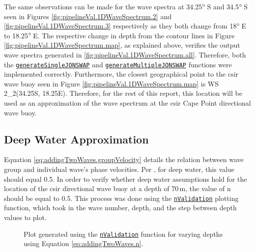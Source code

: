 The same observations can be made for the wave spectra at 34.25$\degree$\,S and 34.5$\degree$\,S seen in Figures \ref{fig:pipelineVal.1DWaveSpectrum.2} and \ref{fig:pipelineVal.1DWaveSpectrum.3} respectively as they both change from 18$\degree$\,E to 18.25$\degree$\,E. The respective change in depth from the contour lines in Figure \ref{fig:pipelineVal.1DWaveSpectrum.map}, as explained above, verifies the output wave spectra generated in \ref{fig:pipelineVal.1DWaveSpectrum.all}. Therefore, both the \href{https://github.com/JNSRYA006/sar-parameter-extraction-pipeline/blob/main/functions/waveSpectra/generateSingleJONSWAP.m}{\lstinline{generateSingleJONSWAP}} and \href{https://github.com/JNSRYA006/sar-parameter-extraction-pipeline/blob/main/functions/waveSpectra/generateMultipleJONSWAP.m}{\lstinline{generateMultipleJONSWAP}} functions were implemented correctly. Furthermore, the closest geographical point to the \acs{csir} wave buoy seen in Figure \ref{fig:pipelineVal.1DWaveSpectrum.map} is WS 2\_2(34.25S, 18.25E). Therefore, for the rest of this report, this location will be used as an approximation of the wave spectrum at the \acs{csir} Cape Point directional wave buoy.

\subsection{Deep Water Approximation} \label{subsec:pipelineVal.waveSpectra.deepWater}

Equation \ref{eq:addingTwoWaves.groupVelocity} details the relation between wave group and individual wave's phase velocities. Per \cite{Holthuijsen2007}, for deep water, this value should equal 0.5. In order to verify whether deep water assumptions hold for the location of the \acs{csir} directional wave buoy at a depth of 70\,m, the value of n should be equal to 0.5. This process was done using the \href{https://github.com/JNSRYA006/sar-parameter-extraction-pipeline/blob/main/functions/waveSpectra/generateMultipleJONSWAP.m}{\lstinline{nValidation}} plotting function, which took in the wave number, depth, and the step between depth values to plot. 

\begin{figure}[H]
    \centering
    \resizebox{0.48\linewidth}{!}{}
    \caption{Plot generated using the \href{https://github.com/JNSRYA006/sar-parameter-extraction-pipeline/blob/main/functions/waveSpectra/generateMultipleJONSWAP.m}{\lstinline{nValidation}} function for varying depths using Equation \ref{eq:addingTwoWaves.n}.}
    \label{fig:pipelineVal.nVal}
\end{figure}


